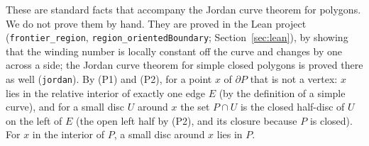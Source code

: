 \documentclass[11pt]{article}
\theoremstyle{definition}
\newcommand{\tL}[1]{\texttt{#1}}
\begin{document}
These are standard facts that accompany the Jordan curve theorem for polygons. We
do not prove them by hand. They are proved in the Lean project (\tL{frontier\_region},
\tL{region\_orientedBoundary}; Section~\ref{sec:lean}), by showing that the
winding number is locally constant off the curve and changes by one across a side; the Jordan curve
theorem for simple closed polygons is proved there as well (\tL{jordan}). By (P1) and
(P2), for a point $x$ of $\partial P$ that is not a vertex: $x$ lies in the relative interior of
exactly one edge $E$ (by the definition of a simple curve), and for a small disc $U$ around $x$ the
set $P\cap U$ is the closed half-disc of $U$ on the left of $E$ (the open left half by (P2), and its
closure because $P$ is closed). For $x$ in the interior of $P$, a small disc around $x$ lies in $P$.
\end{document}
